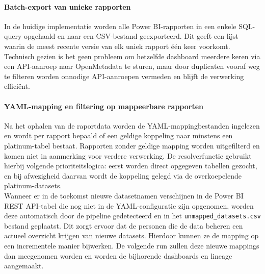 \paragraph{Batch-export van unieke rapporten}

In de huidige implementatie worden alle Power BI-rapporten in een enkele SQL-query opgehaald en naar een CSV-bestand geexporteerd. Dit geeft een lijst waarin de meest recente versie van elk uniek rapport één keer voorkomt. Technisch gezien is het geen probleem om hetzelfde dashboard meerdere keren via een API-aanroep naar OpenMetadata te sturen, maar door duplicaten vooraf weg te filteren worden onnodige API-aanroepen vermeden en blijft de verwerking efficiënt.\\

\paragraph{YAML-mapping en filtering op mappeerbare rapporten}

Na het ophalen van de raportdata worden de YAML-mappingbestanden ingelezen en wordt per rapport bepaald of een geldige koppeling naar minstens een platinum-tabel bestaat. Rapporten zonder geldige mapping worden uitgefilterd en komen niet in aanmerking voor verdere verwerking. De resolverfunctie gebruikt hierbij volgende prioriteitslogica: eerst worden direct opgegeven tabellen gezocht, en bij afwezigheid daarvan wordt de koppeling gelegd via de overkoepelende platinum-datasets.\\

Wanneer er in de toekomst nieuwe datasetnamen verschijnen in de Power BI REST API-tabel die nog niet in de YAML-configuratie zijn opgenomen, worden deze automatisch door de pipeline gedetecteerd en in het \texttt{unmapped_datasets.csv} bestand geplaatst. Dit zorgt ervoor dat de personen die de data beheren een actueel overzicht krijgen van nieuwe datasets. Hierdoor kunnen ze de mapping op een incrementele manier bijwerken. De volgende run zullen deze nieuwe mappings dan meegenomen worden en worden de bijhorende dashboards en lineage aangemaakt.

